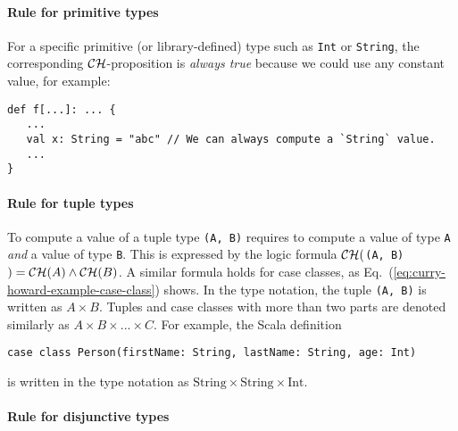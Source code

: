 \paragraph{Rule for primitive types}

For a specific primitive (or library-defined) type such as \lstinline!Int!
or \lstinline!String!,
the corresponding ${\cal CH}$-proposition is \emph{always true} because
we could use any constant value, for example:
\begin{lstlisting}
def f[...]: ... {
   ...
   val x: String = "abc" // We can always compute a `String` value.
   ...
}
\end{lstlisting}

\paragraph{Rule for tuple types}

To compute a value of a tuple type \lstinline!(A, B)!
requires to compute a value of type \lstinline!A!
\emph{and} a value of type \lstinline!B!.
This is expressed by the logic formula ${\cal CH}($\lstinline!(A, B)!$)={\cal CH}(A)\wedge{\cal CH}(B)$.
A similar formula holds for case classes, as Eq.~(\ref{eq:curry-howard-example-case-class})
shows. In the type notation, the tuple \lstinline!(A, B)!
is written as $A\times B$. Tuples and case classes with more than
two parts are denoted similarly as $A\times B\times...\times C$.
For example, the Scala definition
\begin{lstlisting}
case class Person(firstName: String, lastName: String, age: Int)
\end{lstlisting}
is written in the type notation as $\text{String}\times\text{String}\times\text{Int}$.

\paragraph{Rule for disjunctive types}

